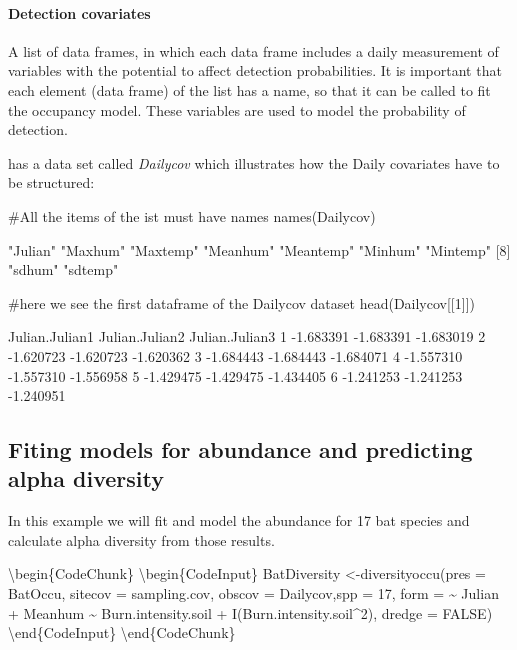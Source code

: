 \documentclass[article]{jss}
\begin{document}
\paragraph{Detection covariates}\label{detection-covariates}

A list of data frames, in which each data frame includes a daily
measurement of variables with the potential to affect detection
probabilities. It is important that each element (data frame) of the
list has a name, so that it can be called to fit the occupancy model.
These variables are used to model the probability of detection.

 has a data set called \emph{Dailycov} which
illustrates how the Daily covariates have to be structured:

\begin{CodeChunk}
\begin{CodeInput}
#All the items of the ist must have names
names(Dailycov)
\end{CodeInput}
\begin{CodeOutput}
[1] "Julian"   "Maxhum"   "Maxtemp"  "Meanhum"  "Meantemp" "Minhum"   "Mintemp" 
[8] "sdhum"    "sdtemp"  
\end{CodeOutput}
\begin{CodeInput}
#here we see the first dataframe of the Dailycov dataset
head(Dailycov[[1]])
\end{CodeInput}
\begin{CodeOutput}
  Julian.Julian1 Julian.Julian2 Julian.Julian3
1      -1.683391      -1.683391      -1.683019
2      -1.620723      -1.620723      -1.620362
3      -1.684443      -1.684443      -1.684071
4      -1.557310      -1.557310      -1.556958
5      -1.429475      -1.429475      -1.434405
6      -1.241253      -1.241253      -1.240951
\end{CodeOutput}
\end{CodeChunk}

\subsection{Fiting models for abundance and predicting alpha
diversity}\label{fiting-models-for-abundance-and-predicting-alpha-diversity}

In this example we will fit and model the abundance for 17 bat species
and calculate alpha diversity from those results.

\textbackslash{}begin\{CodeChunk\} \textbackslash{}begin\{CodeInput\}
BatDiversity \textless{}-diversityoccu(pres = BatOccu, sitecov =
sampling.cov, obscov = Dailycov,spp = 17, form = \textasciitilde{}
Julian + Meanhum \textasciitilde{} Burn.intensity.soil +
I(Burn.intensity.soil\^{}2), dredge = FALSE)
\textbackslash{}end\{CodeInput\} \textbackslash{}end\{CodeChunk\}
\end{document}
